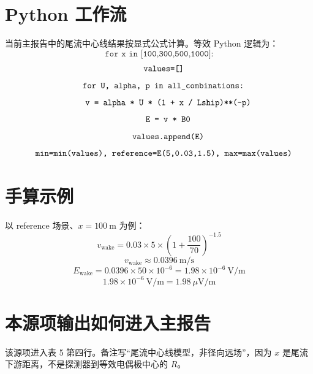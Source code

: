 \documentclass[UTF8,a4paper,11pt]{ctexart}
\begin{document}
\section{Python 工作流}
当前主报告中的尾流中心线结果按显式公式计算。等效 Python 逻辑为：
\[
\texttt{for x in [100,300,500,1000]:}
\]
\[
\texttt{\quad values=[]}
\]
\[
\texttt{\quad for U, alpha, p in all\_combinations:}
\]
\[
\texttt{\quad\quad v = alpha * U * (1 + x / Lship)**(-p)}
\]
\[
\texttt{\quad\quad E = v * B0}
\]
\[
\texttt{\quad\quad values.append(E)}
\]
\[
\texttt{\quad min=min(values),\ reference=E(5,0.03,1.5),\ max=max(values)}
\]

\section{手算示例}
以 reference 场景、$x=100\ \mathrm{m}$ 为例：
\[
v_{\mathrm{wake}}=0.03\times5\times\left(1+\frac{100}{70}\right)^{-1.5}
\]
\[
v_{\mathrm{wake}}\approx0.0396\ \mathrm{m/s}
\]
\[
E_{\mathrm{wake}}=0.0396\times50\times10^{-6}
=1.98\times10^{-6}\ \mathrm{V/m}
\]
\[
1.98\times10^{-6}\ \mathrm{V/m}=1.98\ \mu\mathrm{V/m}
\]

\section{本源项输出如何进入主报告}
该源项进入表 5 第四行。备注写“尾流中心线模型，非径向远场”，因为 $x$ 是尾流下游距离，不是探测器到等效电偶极中心的 $R$。
\end{document}
